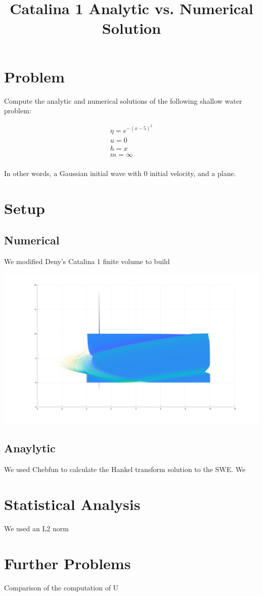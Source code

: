 \documentclass{article}
\title{Catalina 1 Analytic vs. Numerical Solution}
\begin{document}
\maketitle

\section{Problem}

Compute the analytic and numerical solutions of the following shallow water problem:

\[
\begin{aligned}
\eta = e^{-(x-5)^2} \\
u = 0 \\
h = x \\
m = \infty  \\
\end{aligned}
\]

In other words, a Gaussian initial wave with 0 initial velocity, and a plane.

\section{Setup}

\subsection{Numerical}

We modified Deny's Catalina 1 finite volume to build 

\includegraphics[width=\linewidth]{images/anaylytic.png}

\subsection{Anaylytic}

We used Chebfun to calculate the Hankel transform solution to the SWE. We 

\section{Statistical Analysis}

We used an L2 norm

\section{Further Problems}

Comparison of the computation of U
\end{document}

